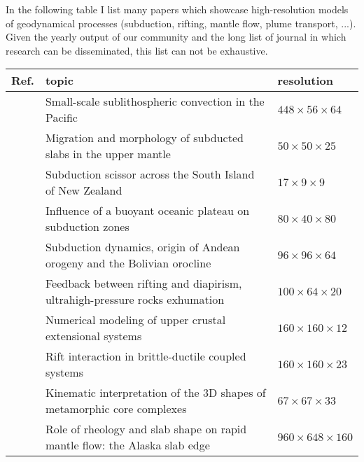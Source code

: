 
In the following table I list many papers which showcase high-resolution models of 
geodynamical processes (subduction, rifting, mantle flow, plume transport, ...).
Given the yearly output of our community and the long list of journal in which 
research can be disseminated, this list can not be exhaustive.

\noindent
{\small
\begin{tabular}{lll}
\hline
Ref.     & topic   & resolution \\
\hline
\hline
\cite{baih10} & Small-scale sublithospheric convection in the Pacific                           & $448\times56\times64$ \\ 
\cite{stsf10} & Migration and morphology of subducted slabs in the upper mantle                 & $50\times50\times25$ \\
\cite{pyeg10} & Subduction scissor across the South Island of New Zealand                       & $17\times9\times9$ \\
\cite{mamb10} & Influence of a buoyant oceanic plateau on subduction zones                      & $80\times 40 \times80$ \\%
\cite{cafz11} & Subduction dynamics, origin of Andean orogeny and the Bolivian orocline         & $96\times96\times64$ \\%
\cite{ellw11} & Feedback between rifting and diapirism, ultrahigh-pressure rocks exhumation     & $100\times64\times20$ \\%
\cite{alht11} & Numerical modeling of upper crustal extensional systems                         & $160\times160\times12$ \\%
\cite{alht12} & Rift interaction in brittle-ductile coupled systems                             & $160\times160\times23$ \\%
\cite{lehm12} & Kinematic interpretation of the 3D shapes of metamorphic core complexes         & $67\times67\times33$ \\%
\cite{jabi12} & Role of rheology and slab shape on rapid mantle flow: the Alaska slab edge      & $960\times648\times160$ \\%

\end{tabular}}
